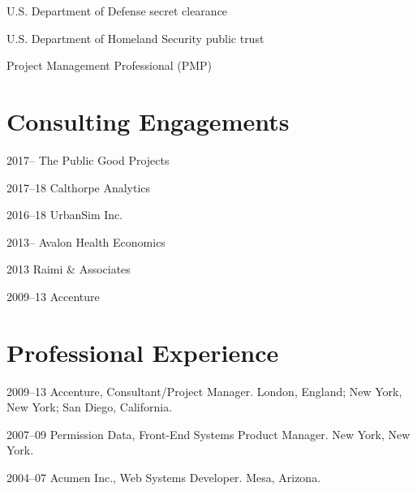\documentclass[12pt,letterpaper]{report}
\newcommand{\listitemspace}{0.15em}
\renewenvironment{itemize}
{\begin{list}{}{\setlength{\leftmargin}{0em}
			\setlength{\parskip}{0em}
			\setlength{\itemsep}{\listitemspace}
			\setlength{\parsep}{\listitemspace}}}
	{\end{list}}
\begin{document}
	\begin{itemize}
		
		\item U.S. Department of Defense secret clearance
		
		\item U.S. Department of Homeland Security public trust
		
		\item Project Management Professional (PMP)
		
	\end{itemize}
	
	
	
	\section*{Consulting Engagements}
	
	\begin{tablist}
		
		\item[2017--]   \tab The Public Good Projects	
		
		\item[2017--18] \tab Calthorpe Analytics
		
		\item[2016--18] \tab UrbanSim Inc.
		
		\item[2013--]   \tab Avalon Health Economics
		
		\item[2013]     \tab Raimi \& Associates
		
		\item[2009--13] \tab Accenture
		
	\end{tablist}
	
	
	
	\section*{Professional Experience}
	
	\begin{tablist}
		
		\item[2009--13] \tab Accenture, Consultant/Project Manager. London, England; New York, New York; San Diego, California.
		
		\item[2007--09] \tab Permission Data, Front-End Systems Product Manager. New York, New York.
		
		\item[2004--07] \tab Acumen Inc., Web Systems Developer. Mesa, Arizona.
		
	\end{tablist}
	
\end{document}
